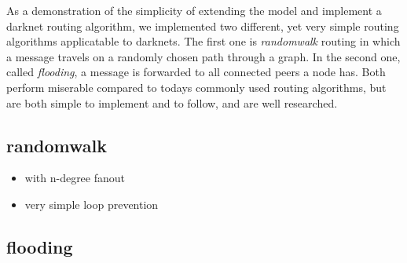 As a demonstration of the simplicity of extending the model and implement a darknet routing algorithm, we implemented two different, yet very simple routing algorithms applicatable to darknets. The first one is \emph{randomwalk} routing in which a message travels on a randomly chosen path through a graph. In the second one, called \emph{flooding}, a message is forwarded to all connected peers a node has. Both perform miserable compared to todays commonly used routing algorithms, but are both simple to implement and to follow, and are well researched.

\subsection{randomwalk}

\begin{itemize}
\item            with n-degree fanout
\item            very simple loop prevention
\end{itemize}

\subsection{flooding}
